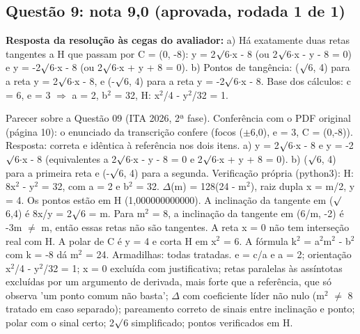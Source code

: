 \documentclass{article}%
\begin{document}
\subsection*{Questão 9: nota 9,0 (aprovada, rodada 1 de 1)}%
\textbf{Resposta da resolução às cegas do avaliador:} a) Há exatamente duas retas tangentes a H que passam por C = (0, -8): y = 2$\surd$6$\cdot$x - 8 (ou 2$\surd$6$\cdot$x - y - 8 = 0) e y = -2$\surd$6$\cdot$x - 8 (ou 2$\surd$6$\cdot$x + y + 8 = 0).\newline%
\newline%
b) Pontos de tangência: ($\surd$6, 4) para a reta y = 2$\surd$6$\cdot$x - 8, e (-$\surd$6, 4) para a reta y = -2$\surd$6$\cdot$x - 8.\newline%
\newline%
Base dos cálculos: c = 6, e = 3 $\Rightarrow$ a = 2, b$^2$ = 32, H: x$^2$/4 - y$^2$/32 = 1.\par %
Parecer sobre a Questão 09 (ITA 2026, 2ª fase).\newline%
\newline%
Conferência com o PDF original (página 10): o enunciado da transcrição confere (focos ($\pm$6,0), e = 3, C = (0,-8)).\newline%
\newline%
Resposta: correta e idêntica à referência nos dois itens.\newline%
a) y = 2$\surd$6$\cdot$x - 8 e y = -2$\surd$6$\cdot$x - 8 (equivalentes a 2$\surd$6$\cdot$x - y - 8 = 0 e 2$\surd$6$\cdot$x + y + 8 = 0).\newline%
b) ($\surd$6, 4) para a primeira reta e (-$\surd$6, 4) para a segunda.\newline%
\newline%
Verificação própria (python3): H: 8x$^2$ - y$^2$ = 32, com a = 2 e b$^2$ = 32. $\Delta$(m) = 128(24 - m$^2$), raiz dupla x = m/2, y = 4. Os pontos estão em H (1,000000000000). A inclinação da tangente em ($\surd$6,4) é 8x/y = 2$\surd$6 = m. Para m$^2$ = 8, a inclinação da tangente em (6/m, -2) é -3m $\neq$ m, então essas retas não são tangentes. A reta x = 0 não tem interseção real com H. A polar de C é y = 4 e corta H em x$^2$ = 6. A fórmula k$^2$ = a$^2$m$^2$ - b$^2$ com k = -8 dá m$^2$ = 24.\newline%
\newline%
Armadilhas: todas tratadas. e = c/a e a = 2; orientação x$^2$/4 - y$^2$/32 = 1; x = 0 excluída com justificativa; retas paralelas às assíntotas excluídas por um argumento de derivada, mais forte que a referência, que só observa 'um ponto comum não basta'; $\Delta$ com coeficiente líder não nulo (m$^2$ $\neq$ 8 tratado em caso separado); pareamento correto de sinais entre inclinação e ponto; polar com o sinal certo; 2$\surd$6 simplificado; pontos verificados em H.\newline%
\end{document}
